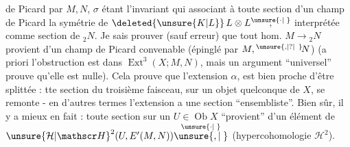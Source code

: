  de Picard  par $M,N$, $\sigma$ étant l'invariant qui  associant à toute section  d'un champ de Picard la symétrie de $\deleted{\unsure{K|L}}\,L\otimes L\overset{\unsure{\cdot|\phantom{\cdot}}}{,}$ interprétée comme section de ${}_{2}N$. Je sais prouver (sauf erreur) que tout hom. $M\to{}_{2}N$ provient d'un champ de Picard convenable (épinglé par $M,{}^{\unsure{\text{,}|?|\phantom{?}}}\!N$) (a priori l'obstruction est dans $\operatorname{Ext}^{3}(X;M,N)$, mais un argument ``universel'' prouve qu'elle est nulle). Cela prouve que l'extension $\alpha$, est bien proche d'être splittée : tte section du troisième faisceau, sur un objet quelconque de $X$, se remonte - en d'autres termes l'extension a une section ``ensembliste''. Bien sûr, il y a mieux en fait : toute section sur un $U\in\operatorname{Ob}X$ ``provient'' d'un élément de ${\unsure{\mathcal H|\mathscr H}}^{2}(U,E'(M,N))\overset{\unsure{\cdot|\phantom{\cdot}}}{\unsure{,|\phantom{,}}}$ (hypercohomologie $\mathcal H^{2}$).
